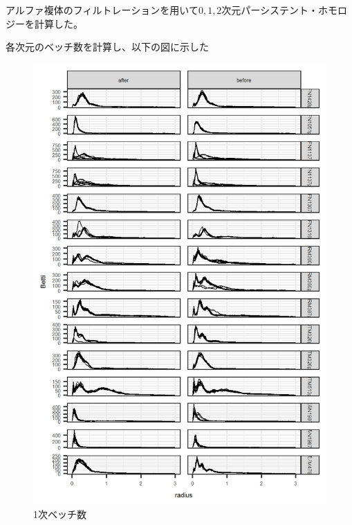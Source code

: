 \documentclass{jarticle}
\begin{document}
アルファ複体のフィルトレーションを用いて$0,1,2$次元パーシステント・ホモロジーを計算した。

各次元のベッチ数を計算し、以下の図に示した

\begin{figure}[H]
\begin{center}
	\includegraphics[width=12cm]{fig/betti_1.png}	
	\caption{1次ベッチ数}\label{fig:ts}
\end{center}
\end{figure}
\end{document}
